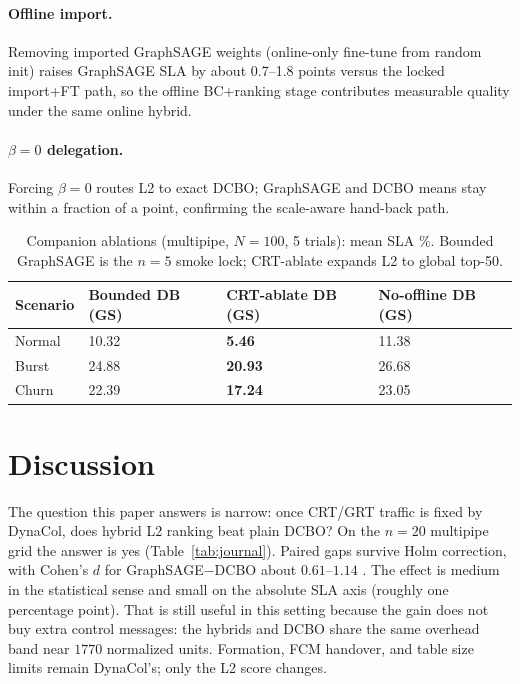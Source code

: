 \documentclass[11pt,a4paper]{article}
\begin{document}
\paragraph{Offline import.}
Removing imported GraphSAGE weights (online-only fine-tune from random init)
raises GraphSAGE SLA by about 0.7--1.8 points versus the locked import+FT path, so
the offline BC+ranking stage contributes measurable quality under the same
online hybrid.

\paragraph{$\beta{=}0$ delegation.}
Forcing $\beta{=}0$ routes L2 to exact DCBO; GraphSAGE and DCBO means stay within a
fraction of a point, confirming the scale-aware hand-back path.

\begin{table}[htbp]
\centering
\caption{Companion ablations (multipipe, $N{=}100$, 5 trials): mean SLA \%.
Bounded GraphSAGE is the $n{=}5$ smoke lock; CRT-ablate expands L2 to global top-50.}
\label{tab:ablate}
\scriptsize
\begin{tabular}{@{}llll@{}}
\toprule
Scenario & Bounded DB (GS) & CRT-ablate DB (GS) & No-offline DB (GS) \\
\midrule
Normal & 10.32 & \textbf{5.46} & 11.38 \\
Burst & 24.88 & \textbf{20.93} & 26.68 \\
Churn & 22.39 & \textbf{17.24} & 23.05 \\
\bottomrule
\end{tabular}
\end{table}

\section{Discussion}
\label{sec:disc}

The question this paper answers is narrow: once CRT/GRT traffic is fixed by
DynaCol, does hybrid L2 ranking beat plain DCBO? On the $n{=}20$ multipipe grid
the answer is yes (Table~\ref{tab:journal}). Paired gaps survive Holm correction,
with Cohen's $d$ for GraphSAGE$-$DCBO about $0.61$--$1.14$
\cite{cohen_power1988}. The effect is medium in the statistical sense and small
on the absolute SLA axis (roughly one percentage point). That is still useful
in this setting because the gain does not buy extra control messages: the
hybrids and DCBO share the same overhead band near $1770$ normalized units.
Formation, FCM handover, and table size limits remain DynaCol's; only the L2
score changes.
\end{document}
